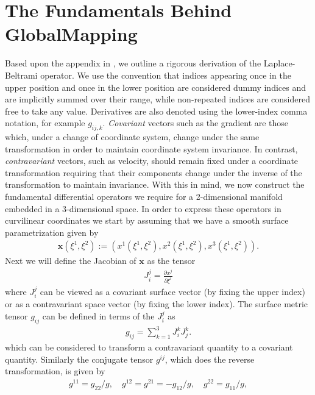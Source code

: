 %
\section{The Fundamentals Behind GlobalMapping}

Based upon the appendix in \cite{CantwellYKPS14}, we 
outline a rigorous derivation of the Laplace-Beltrami operator.
We use the convention that
indices appearing once in the upper position and once in the lower position are
considered dummy indices and are implicitly summed over their range, while
non-repeated indices are considered free to take any value. Derivatives are also
denoted using the lower-index comma notation, for example $g_{ij,k}$.
{\em Covariant} vectors such as the gradient are those which, under a change of
coordinate system, change under the same transformation in order to maintain
coordinate system invariance. In contrast, {\em contravariant} vectors, such as
velocity, should remain fixed under a coordinate transformation requiring that
their components change under the inverse of the transformation to maintain
invariance.
With this in mind, we now construct the fundamental differential operators we
require for a 2-dimensional manifold embedded in a 3-dimensional space.
In order to express these operators in curvilinear coordinates we start by
assuming that we have a smooth surface parametrization given by
\begin{align*}
	\bm{x}(\xi^1,\xi^2):=(x^1(\xi^1,\xi^2),x^2(\xi^1,\xi^2),x^3(\xi^1,\xi^2)).
\end{align*}
Next we will define the Jacobian of $\bm{x}$ as the tensor
\begin{align*}
        J_i^j = \frac{\partial x^j}{\partial \xi^i}
\end{align*}
where $J_i^j$ can be viewed as a covariant surface vector (by fixing the upper 
index) or as a contravariant space vector (by fixing the lower index). The
surface metric tensor $g_{ij}$ can be defined in terms of the $J_i^j$ as
\begin{align}
    g_{ij} = \sum_{k=1}^3 J_i^k J_j^k.
    \label{A:metric_tensor}
\end{align}
which can be considered to transform a contravariant quantity to a covariant 
quantity. Similarly the conjugate tensor $g^{ij}$, which does the reverse 
transformation, is given by
\begin{align}
    g^{11} = g_{22}/g,\quad g^{12} = g^{21} = - g_{12}/g,\quad g^{22} = g_{11}/g,
    \label{A:conj_tensor}
\end{align}
